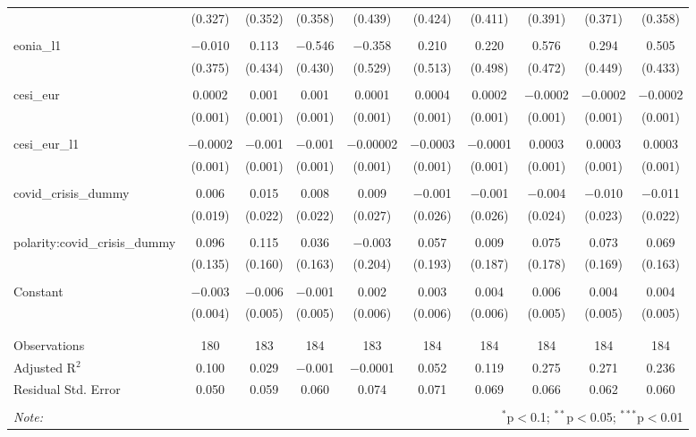 \begin{table}[!htbp]
\begin{adjustbox}{width=1.25\textwidth}
\begin{tabular}{@{\extracolsep{5pt}}lccccccccc}
  & (0.327) & (0.352) & (0.358) & (0.439) & (0.424) & (0.411) & (0.391) & (0.371) & (0.358) \\ 
  & & & & & & & & & \\ 
 eonia\_l1 & $-$0.010 & 0.113 & $-$0.546 & $-$0.358 & 0.210 & 0.220 & 0.576 & 0.294 & 0.505 \\ 
  & (0.375) & (0.434) & (0.430) & (0.529) & (0.513) & (0.498) & (0.472) & (0.449) & (0.433) \\ 
  & & & & & & & & & \\ 
 cesi\_eur & 0.0002 & 0.001 & 0.001 & 0.0001 & 0.0004 & 0.0002 & $-$0.0002 & $-$0.0002 & $-$0.0002 \\ 
  & (0.001) & (0.001) & (0.001) & (0.001) & (0.001) & (0.001) & (0.001) & (0.001) & (0.001) \\ 
  & & & & & & & & & \\ 
 cesi\_eur\_l1 & $-$0.0002 & $-$0.001 & $-$0.001 & $-$0.00002 & $-$0.0003 & $-$0.0001 & 0.0003 & 0.0003 & 0.0003 \\ 
  & (0.001) & (0.001) & (0.001) & (0.001) & (0.001) & (0.001) & (0.001) & (0.001) & (0.001) \\ 
  & & & & & & & & & \\ 
 covid\_crisis\_dummy & 0.006 & 0.015 & 0.008 & 0.009 & $-$0.001 & $-$0.001 & $-$0.004 & $-$0.010 & $-$0.011 \\ 
  & (0.019) & (0.022) & (0.022) & (0.027) & (0.026) & (0.026) & (0.024) & (0.023) & (0.022) \\ 
  & & & & & & & & & \\ 
 polarity:covid\_crisis\_dummy & 0.096 & 0.115 & 0.036 & $-$0.003 & 0.057 & 0.009 & 0.075 & 0.073 & 0.069 \\ 
  & (0.135) & (0.160) & (0.163) & (0.204) & (0.193) & (0.187) & (0.178) & (0.169) & (0.163) \\ 
  & & & & & & & & & \\ 
 Constant & $-$0.003 & $-$0.006 & $-$0.001 & 0.002 & 0.003 & 0.004 & 0.006 & 0.004 & 0.004 \\ 
  & (0.004) & (0.005) & (0.005) & (0.006) & (0.006) & (0.006) & (0.005) & (0.005) & (0.005) \\ 
  & & & & & & & & & \\ 
\hline \\[-1.8ex] 
Observations & 180 & 183 & 184 & 183 & 184 & 184 & 184 & 184 & 184 \\ 
Adjusted R$^{2}$ & 0.100 & 0.029 & $-$0.001 & $-$0.0001 & 0.052 & 0.119 & 0.275 & 0.271 & 0.236 \\ 
Residual Std. Error & 0.050 & 0.059 & 0.060 & 0.074 & 0.071 & 0.069 & 0.066 & 0.062 & 0.060 \\ 
\hline 
\hline \\[-1.8ex] 
\textit{Note:}  & \multicolumn{9}{r}{$^{*}$p$<$0.1; $^{**}$p$<$0.05; $^{***}$p$<$0.01} \\ 
\end{tabular} 
\end{adjustbox} 
\end{table} 
